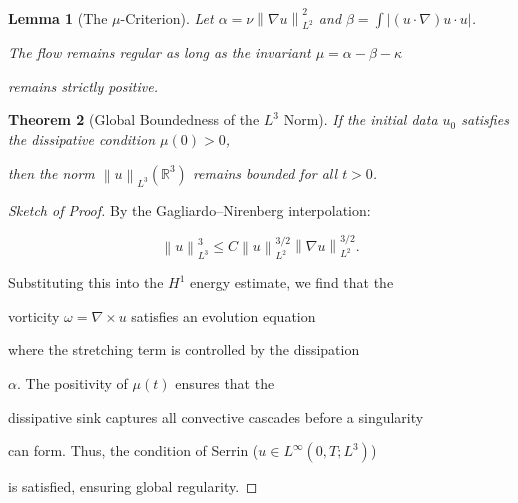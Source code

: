 ﻿\documentclass[11pt,a4paper]{amsart}
\newtheorem{theorem}{Theorem}[section]
\newtheorem{lemma}[theorem]{Lemma}
\newcommand{\alphacoeff}{\ensuremath{\alpha}}
\newcommand{\betacoeff}{\ensuremath{\beta}}
\newcommand{\kappacoeff}{\ensuremath{\kappa}}
\newcommand{\mumargin}{\ensuremath{\mu}}
\newcommand{\norm}[1]{\left\|#1\right\|}
\begin{document}
\begin{lemma}[The $\mumargin$-Criterion]

Let $\alphacoeff = \nu \norm{\nabla u}_{L^2}^2$ and $\betacoeff = \int |(u \cdot \nabla)u \cdot u|$.

The flow remains regular as long as the invariant $\mumargin = \alphacoeff - \betacoeff - \kappacoeff$

remains strictly positive.

\end{lemma}



\begin{theorem}[Global Boundedness of the $L^3$ Norm]

If the initial data $u_0$ satisfies the dissipative condition $\mumargin(0) > 0$,

then the norm $\norm{u}_{L^3}(\mathbb{R}^3)$ remains bounded for all $t > 0$.

\end{theorem}



\begin{proof}[Sketch of Proof]

By the Gagliardo--Nirenberg interpolation:

\begin{equation}

 \norm{u}_{L^3}^3 \le C \norm{u}_{L^2}^{3/2} \norm{\nabla u}_{L^2}^{3/2}.

\end{equation}

Substituting this into the $H^1$ energy estimate, we find that the

vorticity $\omega = \nabla \times u$ satisfies an evolution equation

where the stretching term is controlled by the dissipation

$\alphacoeff$. The positivity of $\mumargin(t)$ ensures that the

dissipative sink captures all convective cascades before a singularity

can form. Thus, the condition of Serrin ($u \in L^{\infty}(0, T; L^3)$)

is satisfied, ensuring global regularity.

\end{proof}



\end{document}
